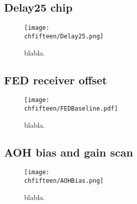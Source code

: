 \subsection*{Delay25 chip}

\begin{figure}[!htb]
 \begin{center}
 \texttt{[image: \\chfifteen/Delay25.png]}
 \end{center}
 \caption{blabla.}
 \label{fig:Delay25}
\end{figure}

\subsection*{FED receiver offset}


\begin{figure}[!htb]
 \begin{center}
 \texttt{[image: \\chfifteen/FEDBaseline.pdf]}
 \end{center}
 \caption{blabla.}
 \label{fig:FEDBaseline}
\end{figure}

\subsection*{AOH bias and gain scan}

\begin{figure}[!htb]
 \begin{center}
 \texttt{[image: \\chfifteen/AOHBias.png]}
 \end{center}
 \caption{blabla.}
 \label{fig:AOHBias}
\end{figure}

